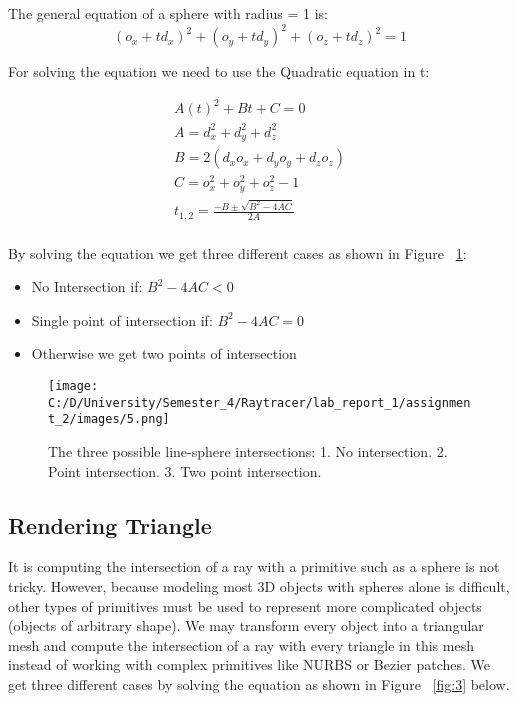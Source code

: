 \documentclass{article}
\begin{document}
	The general equation of a sphere with radius = 1 is:
	\begin{equation}
		(o_x + td_x )^2 + (o_y + td_y )^2+ (o_z + td_z )^2= 1
	\end{equation}
	
	For solving the equation we need to use the Quadratic equation in t: 
	
	\begin{equation}
		\begin{split}
			A(t)^2 + Bt+ C= 0 \\
			A = d^2_x + d^2_y + d^2_z \\	
			B = 2(d_xo_x + d_yo_y + d_zo_z) \\
			C = o^2_x + o^2_y + o^2_z - 1 \\
			t_{1,2} = \frac{-B \pm \sqrt{B^2 - 4AC}}{2A}\\
		\end{split}		
	\end{equation}
	
	
	By solving the equation we get three different cases as shown in Figure ~\ref{fig:2}:
	
	\begin{itemize}
		\item No Intersection if: \( B^2 - 4AC < 0 \) 
		\item Single point of intersection if: \( B^2 - 4AC = 0 \)
		\item Otherwise we get two points of intersection
	\end{itemize}
	
	
	\begin{figure}[H]
		\begin{center}
			\texttt{[image: C:/D/University/Semester\_4/Raytracer/lab\_report\_1/assignment\_2/images/5.png]}
			
			\caption{The three possible line-sphere intersections:
				1. No intersection.
				2. Point intersection.
				3. Two point intersection.}
			\label{fig:2}
		\end{center}
	\end{figure}
	
	\subsection{Rendering Triangle}
	It is computing the intersection of a ray with a primitive such as a sphere is not tricky. However, because modeling most 3D objects with spheres alone is difficult, other types of primitives must be used to represent more complicated objects (objects of arbitrary shape).
	We may transform every object into a triangular mesh and compute the intersection of a ray with every triangle in this mesh instead of working with complex primitives like NURBS or Bezier patches.
	We get three different cases by solving the equation as shown in Figure ~\ref{fig:3} below.
	
\end{document}
